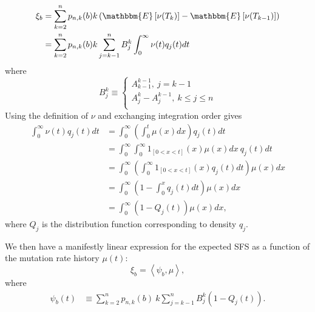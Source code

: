 \documentclass[11pt]{article}
\begin{document}
\begin{align*}
\xi_b &= \sum_{k=2}^n p_{n,k}(b) k \left(\mathbbm{E}\left[\nu(T_{k})\right] - \mathbbm{E}\left[\nu(T_{k-1})\right]\right)\\
&= \sum_{k=2}^n p_{n,k}(b) k \sum_{j=k-1}^{n}B_j^k\int_0^\infty\nu(t)q_j(t)dt
\end{align*}
where
\[
B_j^k \equiv
\begin{cases}
A_{k-1}^{k-1},\ j=k-1\\
A_j^k - A_j^{k-1},\ k\le j\le n\\
\end{cases}
\]
Using the definition of $\nu$ and exchanging integration order gives
\begin{align*}
\int_0^\infty\nu(t)q_j(t)dt &= \int_0^\infty \left(\int_0^t\mu(x)dx\right) q_j(t)dt\\
&= \int_0^\infty \int_0^\infty 1_{[0<x<t]}(x)\mu(x)dx\ q_j(t)dt\\
&= \int_0^\infty \left(\int_0^\infty 1_{[0<x<t]}(x)q_j(t)dt\right)\mu(x) dx\\
&= \int_0^\infty \left(1-\int_0^x q_j(t)dt\right)\mu(x) dx\\
&= \int_0^\infty \left(1-Q_j(t)\right)\mu(x) dx,
\end{align*}
where $Q_j$ is the distribution function corresponding to density $q_j$.

We then have a manifestly linear expression for the expected SFS as a function of the mutation rate history $\mu(t)$:
\[
\xi_b = \left<\psi_b, \mu\right>,
\]
where
\begin{align*}
\psi_b(t) &\equiv \sum_{k=2}^n p_{n,k}(b)\ k \sum_{j=k-1}^{n}B_j^k \left(1-Q_j(t)\right).
\end{align*}
\end{document}
